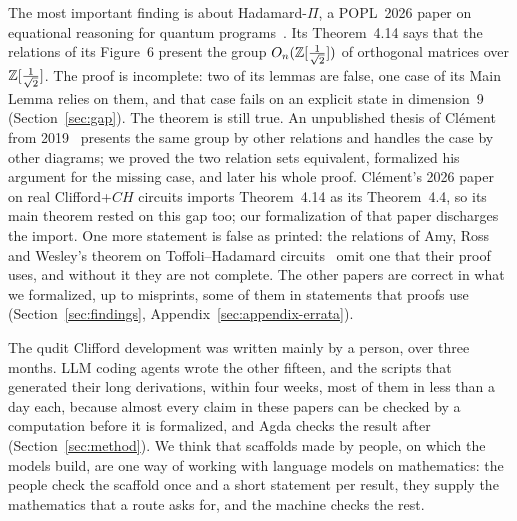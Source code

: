The most important finding is about Hadamard-$\Pi$, a POPL~2026 paper
on equational reasoning for quantum programs~\cite{fang2026hadamard}.
Its Theorem~4.14 says that the relations of its Figure~6 present the
group $O_n(\mathbb{Z}[\frac1{\sqrt2}])$ of orthogonal matrices over
$\mathbb{Z}[\frac1{\sqrt2}]$. The proof is incomplete: two of its lemmas are
false, one case of its Main Lemma relies on them, and that case fails
on an explicit state in dimension~9 (Section~\ref{sec:gap}). The
theorem is still true. An unpublished thesis of Cl\'ement from
2019~\cite{clement2019thesis} presents the same group by other
relations and handles the case by other diagrams; we proved the two
relation sets equivalent, formalized his argument for the missing
case, and later his whole proof. Cl\'ement's 2026 paper on real
Clifford+$CH$ circuits imports Theorem~4.14 as its Theorem~4.4, so its
main theorem rested on this gap too; our formalization of that paper
discharges the import. One more statement is false as printed: the
relations of Amy, Ross and Wesley's theorem on Toffoli--Hadamard
circuits~\cite{amy2024toffoli} omit one that their proof uses, and
without it they are not complete. The other papers are correct in what
we formalized, up to misprints, some of them in statements that proofs
use (Section~\ref{sec:findings}, Appendix~\ref{sec:appendix-errata}).

The qudit Clifford development was written mainly by a person, over
three months. LLM coding agents wrote the other fifteen, and the
scripts that generated their long derivations, within four weeks, most
of them in less than a day each, because almost every claim in these
papers can be checked by a computation before it is formalized, and
Agda checks the result after (Section~\ref{sec:method}). We think that
scaffolds made by people, on which the models build, are one way of
working with language models on mathematics: the people check the
scaffold once and a short statement per result, they supply the
mathematics that a route asks for, and the machine checks the rest.

